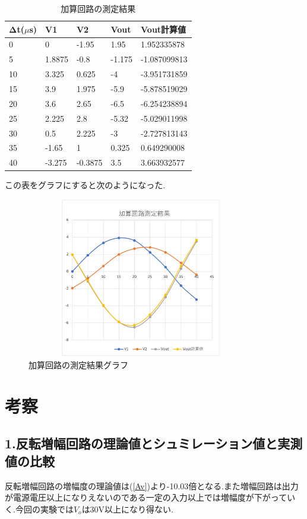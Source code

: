 \documentclass[a4j,10pt,dvipdfmx]{jarticle}
\begin{document}
\begin{table}[H]
  \begin{center}
  \begin{tabular}{|l|l|l|l|l|}
  \hline
      Δt($\mu$s) & V1 & V2 & Vout & Vout計算値 \\ \hline
      0 & 0 & -1.95 & 1.95 & 1.952335878 \\ \hline
      5 & 1.8875 & -0.8 & -1.175 & -1.087099813 \\ \hline
      10 & 3.325 & 0.625 & -4 & -3.951731859 \\ \hline
      15 & 3.9 & 1.975 & -5.9 & -5.878519029 \\ \hline
      20 & 3.6 & 2.65 & -6.5 & -6.254238894 \\ \hline
      25 & 2.225 & 2.8 & -5.32 & -5.029011998 \\ \hline
      30 & 0.5 & 2.225 & -3 & -2.727813143 \\ \hline
      35 & -1.65 & 1 & 0.325 & 0.649290008 \\ \hline
      40 & -3.275 & -0.3875 & 3.5 & 3.663932577 \\ \hline
  \end{tabular}
  \caption{加算回路の測定結果}
\end{center}
\end{table}
この表をグラフにすると次のようになった.
\begin{figure}[H]
  \begin{center}
  \includegraphics[height=7cm,width=10cm]{kasangurafu.png}
  \caption{加算回路の測定結果グラフ}
\end{center}
\end{figure}
\section{考察}
\subsection{1.反転増幅回路の理論値とシュミレーション値と実測値の比較}
反転増幅回路の増幅度の理論値は(\ref{Av})より-10.03倍となる.また増幅回路は出力が電源電圧以上になりえないのである一定の入力以上では増幅度が下がっていく.今回の実験では$V_o$は30V以上になり得ない.
\end{document}
